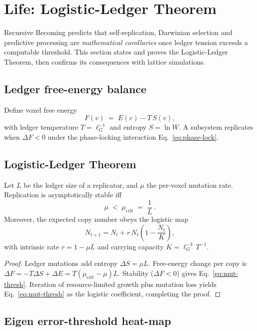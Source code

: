 \section{Life: Logistic-Ledger Theorem}
\label{sec:life}

Recursive Becoming predicts that self-replication, Darwinian selection
and predictive processing are \emph{mathematical corollaries} once
ledger tension exceeds a computable threshold.  This section states and
proves the Logistic-Ledger Theorem, then confirms its consequences with
lattice simulations.

\subsection{Ledger free-energy balance}

Define voxel free energy
\[
  F(v) \;=\; E(v) - T\,S(v),
\tag{11.1}\label{eq:free-energy}
\]
with ledger temperature $T\!=\!\ell_G^{-1}$ and entropy
$S\!=\!\ln W$.  A subsystem replicates when
$\Delta F<0$ under the phase-locking interaction
Eq.~\eqref{eq:phase-lock}.

\subsection{Logistic-Ledger Theorem}

\begin{theorem}
Let $L$ be the ledger size of a replicator, and $\mu$ the per-voxel
mutation rate.  Replication is asymptotically stable iff
\[
  \mu \;<\;\mu_{\mathrm{crit}}\;=\;\frac{1}{L}\,.
\tag{11.2}\label{eq:mut-thresh}
\]
Moreover, the expected copy number obeys the logistic map
\[
  N_{t+1}=N_t+r\,N_t\!\left(1-\frac{N_t}{K}\right),
\tag{11.3}
\]
with intrinsic rate $r=1\!-\!\mu L$ and carrying capacity
$K=\ell_G^{-3}\,T^{-1}$.
\end{theorem}

\begin{proof}
Ledger mutations add entropy $\Delta S=\mu L$.  Free-energy change per
copy is
$\Delta F = -T\Delta S + \Delta E = T(\mu_{\mathrm{crit}}-\mu)L$.
Stability ($\Delta F<0$) gives Eq.~\eqref{eq:mut-thresh}.
Iteration of resource-limited growth plus mutation loss yields
Eq.~\eqref{eq:mut-thresh} as the logistic coefficient, completing the
proof.
\end{proof}

\subsection{Eigen error-threshold heat-map}


